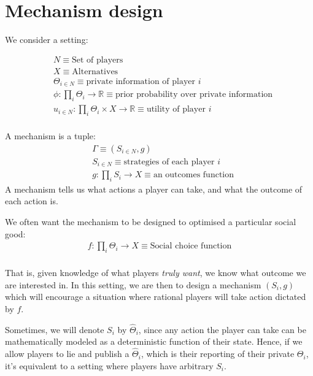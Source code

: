 \documentclass[11pt]{book}
\begin{document}
\section{Mechanism design}
We consider a setting:

\begin{align*}
    &N \equiv \text{Set of players} \\
    &X  \equiv \text{Alternatives} \\
    &\Theta_{i \in N} \equiv \text{private information of player $i$} \\
    &\phi: \prod_i \Theta_i \rightarrow \mathbb R \equiv \text{prior probability over private information} \\
    &u_{i \in N}: \prod_i \Theta_i \times X \rightarrow \mathbb R \equiv \text{utility of player $i$} \\
\end{align*}

A mechanism is a tuple:
\begin{align*}
    &\Gamma \equiv (S_{i \in N}, g) \\
    &S_{i \in N} \equiv \text{strategies of each player $i$} \\
    &g: \prod_i S_i \rightarrow X \equiv \text{an outcomes function}
\end{align*}
A mechanism tells us what actions a player can take, and what the outcome
of each action is.

We often want the mechanism to be designed to optimised a particular social good:
\begin{align*}
    f: \prod_i \Theta_i \rightarrow X \equiv \text{Social choice function} \\
\end{align*}

That is, given knowledge of what players \emph{truly want}, we know what
outcome we are interested in. In this setting, we are then to design 
a mechanism $(S_i, g)$ which will encourage a situation where rational players
will take action dictated by $f$.

Sometimes, we will denote $S_i$ by $\hat \Theta_i$, since any action the
player can take can be mathematically modeled as a deterministic function
of their state. Hence, if we allow players to lie and publish 
a $\hat \Theta_i$, which is their reporting of their private $\Theta_i$, it's
equivalent to a setting where players have arbitrary $S_i$.
\end{document}
